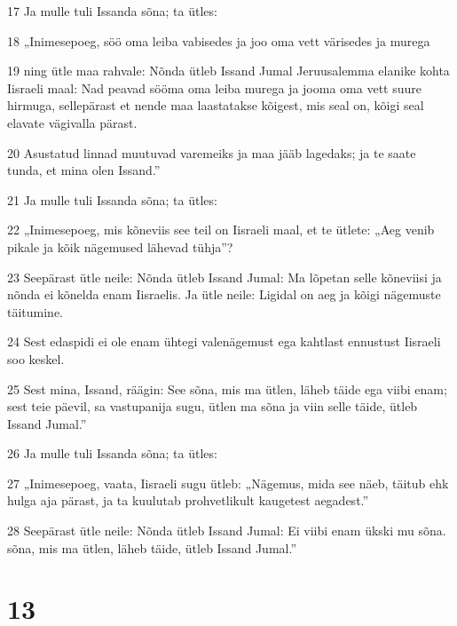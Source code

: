 \par 17 Ja mulle tuli Issanda sõna; ta ütles:
\par 18 „Inimesepoeg, söö oma leiba vabisedes ja joo oma vett värisedes ja murega
\par 19 ning ütle maa rahvale: Nõnda ütleb Issand Jumal Jeruusalemma elanike kohta Iisraeli maal: Nad peavad sööma oma leiba murega ja jooma oma vett suure hirmuga, sellepärast et nende maa laastatakse kõigest, mis seal on, kõigi seal elavate vägivalla pärast.
\par 20 Asustatud linnad muutuvad varemeiks ja maa jääb lagedaks; ja te saate tunda, et mina olen Issand.”
\par 21 Ja mulle tuli Issanda sõna; ta ütles:
\par 22 „Inimesepoeg, mis kõneviis see teil on Iisraeli maal, et te ütlete: „Aeg venib pikale ja kõik nägemused lähevad tühja”?
\par 23 Seepärast ütle neile: Nõnda ütleb Issand Jumal: Ma lõpetan selle kõneviisi ja nõnda ei kõnelda enam Iisraelis. Ja ütle neile: Ligidal on aeg ja kõigi nägemuste täitumine.
\par 24 Sest edaspidi ei ole enam ühtegi valenägemust ega kahtlast ennustust Iisraeli soo keskel.
\par 25 Sest mina, Issand, räägin: See sõna, mis ma ütlen, läheb täide ega viibi enam; sest teie päevil, sa vastupanija sugu, ütlen ma sõna ja viin selle täide, ütleb Issand Jumal.”
\par 26 Ja mulle tuli Issanda sõna; ta ütles:
\par 27 „Inimesepoeg, vaata, Iisraeli sugu ütleb: „Nägemus, mida see näeb, täitub ehk hulga aja pärast, ja ta kuulutab prohvetlikult kaugetest aegadest.”
\par 28 Seepärast ütle neile: Nõnda ütleb Issand Jumal: Ei viibi enam ükski mu sõna. sõna, mis ma ütlen, läheb täide, ütleb Issand Jumal.”

\chapter{13}

